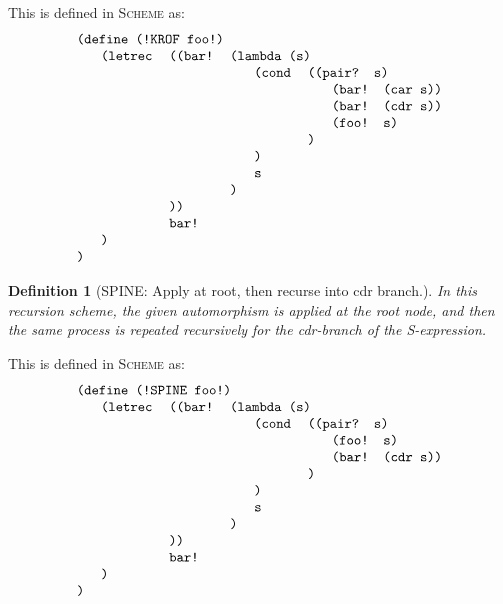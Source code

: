 \documentclass[11pt]{article} %
\newcommand{\eeq}{\end{equation}}
\newcommand{\beql}[1]{\begin{equation}\label{#1}}
\newcommand{\autletter}[1]{$#1$}
\newcommand{\automorphismlet}[1]{automorphism~\autletter{#1}}
\newcommand{\proglangname}[1]{{\textsc{#1}}}
\newcommand{\scmcode}[1]{{\tt{#1}}}
\newtheorem{definition}[theorem]{Definition}
\newenvironment{scmdefinefun7}{\begin{tabular}{l l l l l l l}}{\end{tabular}}
\begin{document}
This is defined in \proglangname{Scheme} as:
\beql{definerecscheme1} 
\begin{scmdefinefun7}
\multicolumn{7}{l}{\scmcode{(define (!KROF foo!)}}\\
 & \scmcode{(letrec} & \scmcode{((bar!} & \multicolumn{4}{l}{\scmcode{(lambda (s)}}\\
 & & & & \scmcode{(cond} & \multicolumn{2}{l}{\scmcode{((pair? s)}}\\
 & & & & & & \scmcode{(bar! (car s))}\\
 & & & & & & \scmcode{(bar! (cdr s))}\\
 & & & & & & \scmcode{(foo! s)}\\
 & & & & & \scmcode{)}\\ %
 & & & & \scmcode{)}\\ %
 & & & & \scmcode{s}\\
 & & & \scmcode{)}\\ %
 & & \scmcode{))}\\ %
 & & \scmcode{bar!}\\ 
 & \scmcode{)}\\  %
\scmcode{)}\\ %
\end{scmdefinefun7}
\eeq


\begin{definition}[{SPINE: Apply at root, then recurse into cdr branch.}]
\normalfont
In this recursion scheme, the given automorphism %
is applied at the root node, and then the same process
is repeated recursively for the cdr-branch of the S-expression.
\end{definition}

This is defined in \proglangname{Scheme} as:
\beql{definerecscheme2} 
\begin{scmdefinefun7}
\multicolumn{7}{l}{\scmcode{(define (!SPINE foo!)}}\\
 & \scmcode{(letrec} & \scmcode{((bar!} & \multicolumn{4}{l}{\scmcode{(lambda (s)}}\\
 & & & & \scmcode{(cond} & \multicolumn{2}{l}{\scmcode{((pair? s)}}\\
 & & & & & & \scmcode{(foo! s)}\\
 & & & & & & \scmcode{(bar! (cdr s))}\\
 & & & & & \scmcode{)}\\ %
 & & & & \scmcode{)}\\ %
 & & & & \scmcode{s}\\
 & & & \scmcode{)}\\ %
 & & \scmcode{))}\\ %
 & & \scmcode{bar!}\\ 
 & \scmcode{)}\\  %
\scmcode{)}\\ %
\end{scmdefinefun7}
\eeq
\end{document}
